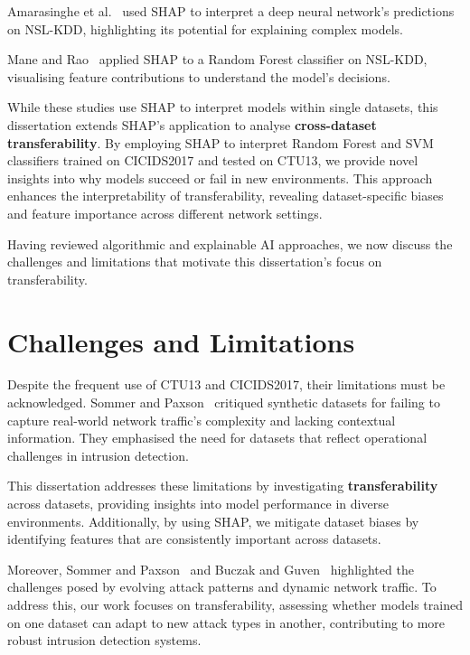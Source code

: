 Amarasinghe et al.~\cite{amarasinghe2018toward} used SHAP to interpret a deep neural network’s predictions on NSL-KDD, highlighting its potential for explaining complex models.

Mane and Rao~\cite{mane2021explaining} applied SHAP to a Random Forest classifier on NSL-KDD, visualising feature contributions to understand the model’s decisions.

While these studies use SHAP to interpret models within single datasets, this dissertation extends SHAP’s application to analyse \textbf{cross-dataset transferability}. By employing SHAP to interpret Random Forest and SVM classifiers trained on CICIDS2017 and tested on CTU13, we provide novel insights into why models succeed or fail in new environments. This approach enhances the interpretability of transferability, revealing dataset-specific biases and feature importance across different network settings.

Having reviewed algorithmic and explainable AI approaches, we now discuss the challenges and limitations that motivate this dissertation’s focus on transferability.

\section{Challenges and Limitations}\label{sec:ChallengesLimitations}

Despite the frequent use of CTU13 and CICIDS2017, their limitations must be acknowledged. Sommer and Paxson~\cite{sommer2010outside} critiqued synthetic datasets for failing to capture real-world network traffic’s complexity and lacking contextual information. They emphasised the need for datasets that reflect operational challenges in intrusion detection.

This dissertation addresses these limitations by investigating \textbf{transferability} across datasets, providing insights into model performance in diverse environments. Additionally, by using SHAP, we mitigate dataset biases by identifying features that are consistently important across datasets.

Moreover, Sommer and Paxson~\cite{sommer2010outside} and Buczak and Guven~\cite{buczak2015survey} highlighted the challenges posed by evolving attack patterns and dynamic network traffic. To address this, our work focuses on transferability, assessing whether models trained on one dataset can adapt to new attack types in another, contributing to more robust intrusion detection systems.


